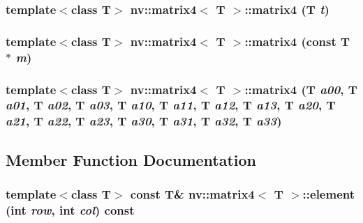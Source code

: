 \hypertarget{classnv_1_1matrix4_008c4829e82374912faac747690c6466}{
\subsubsection[{matrix4}]{\setlength{\rightskip}{0pt plus 5cm}template$<$class T$>$ {\bf nv::matrix4}$<$ T $>$::{\bf matrix4} (T {\em t})}}
\label{classnv_1_1matrix4_008c4829e82374912faac747690c6466}


\hypertarget{classnv_1_1matrix4_0c19e0e5585f99d0c6423b157a927832}{
\subsubsection[{matrix4}]{\setlength{\rightskip}{0pt plus 5cm}template$<$class T$>$ {\bf nv::matrix4}$<$ T $>$::{\bf matrix4} (const T $\ast$ {\em m})}}
\label{classnv_1_1matrix4_0c19e0e5585f99d0c6423b157a927832}


\hypertarget{classnv_1_1matrix4_409943020eb2f60eed7c64ecfb803e37}{
\subsubsection[{matrix4}]{\setlength{\rightskip}{0pt plus 5cm}template$<$class T$>$ {\bf nv::matrix4}$<$ T $>$::{\bf matrix4} (T {\em a00}, \/  T {\em a01}, \/  T {\em a02}, \/  T {\em a03}, \/  T {\em a10}, \/  T {\em a11}, \/  T {\em a12}, \/  T {\em a13}, \/  T {\em a20}, \/  T {\em a21}, \/  T {\em a22}, \/  T {\em a23}, \/  T {\em a30}, \/  T {\em a31}, \/  T {\em a32}, \/  T {\em a33})}}
\label{classnv_1_1matrix4_409943020eb2f60eed7c64ecfb803e37}




\subsection{Member Function Documentation}
\hypertarget{classnv_1_1matrix4_a08fdc3168b2195b23cf46e55fc7352d}{
\subsubsection[{element}]{\setlength{\rightskip}{0pt plus 5cm}template$<$class T$>$ const T\& {\bf nv::matrix4}$<$ T $>$::element (int {\em row}, \/  int {\em col}) const}}
\label{classnv_1_1matrix4_a08fdc3168b2195b23cf46e55fc7352d}


